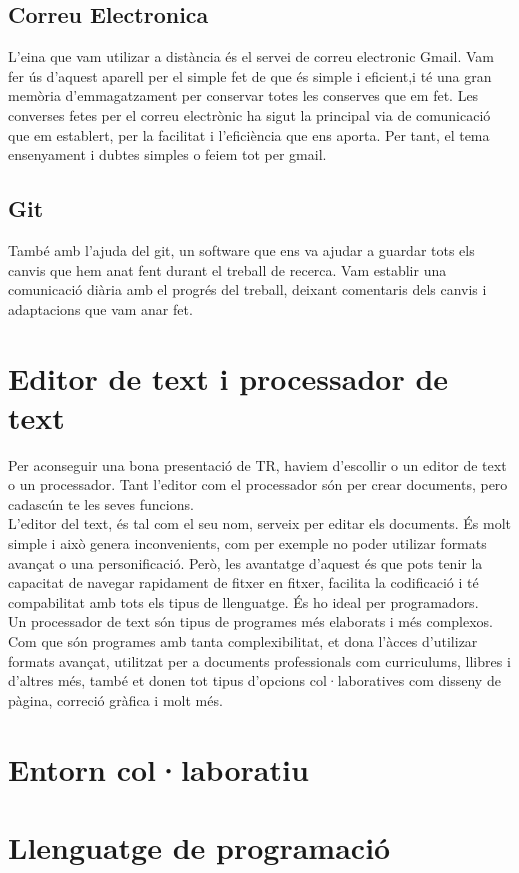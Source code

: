 \subsection{Correu Electronica}
L'eina que vam utilizar a distància és el servei de correu electronic Gmail. Vam fer ús d'aquest aparell per el simple fet de que és simple i eficient,i té una gran memòria d'emmagatzament per conservar totes les conserves que em fet.
Les converses fetes per el correu electrònic ha sigut la principal via de comunicació que em establert, per la facilitat i l'eficiència que ens aporta. Per tant, el tema ensenyament i dubtes simples o feiem tot per gmail.

\subsection{Git}
També amb l'ajuda del git, un software que ens va ajudar a guardar tots els canvis que hem anat fent durant el treball de recerca. Vam  establir una comunicació diària amb el progrés del treball, deixant comentaris dels canvis i adaptacions que vam anar fet.


\section{Editor de text i processador de text}\label{4.2}
Per aconseguir una bona presentació de TR, haviem d'escollir o un editor de text o un processador. Tant l'editor com el processador són per crear documents, pero cadascún te les seves funcions.\\
L'editor del text, és tal com el seu nom, serveix per editar els documents. És molt simple i això genera inconvenients, com per exemple no poder utilizar formats avançat o una personificació. Però, les avantatge d'aquest és que pots tenir la capacitat de navegar rapidament de fitxer en fitxer, facilita la codificació i té compabilitat amb tots els tipus de llenguatge. És ho ideal per programadors.\\
Un processador de text són tipus de programes més elaborats i més complexos. Com que són programes amb tanta complexibilitat, et dona l'àcces d'utilizar formats avançat, utilitzat per a documents professionals com curriculums, llibres i d'altres més, també et donen tot tipus d'opcions col·laboratives com disseny de pàgina, correció gràfica i molt més.

\section{Entorn col·laboratiu}\label{4.3}
\section{Llenguatge de programació}\label{4.4}

